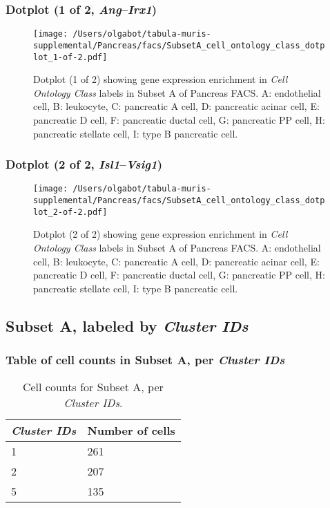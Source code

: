 \clearpage

\subsubsection{Dotplot (1 of 2, \emph{Ang}--\emph{Irx1})}
\begin{figure}[h]
\centering
\texttt{[image: /Users/olgabot/tabula-muris-supplemental/Pancreas/facs/SubsetA\_cell\_ontology\_class\_dotplot\_1-of-2.pdf]}

\caption{ Dotplot (1 of 2)  showing gene expression enrichment in \emph{Cell Ontology Class} labels in Subset A of Pancreas FACS. A: endothelial cell, B: leukocyte, C: pancreatic A cell, D: pancreatic acinar cell, E: pancreatic D cell, F: pancreatic ductal cell, G: pancreatic PP cell, H: pancreatic stellate cell, I: type B pancreatic cell.}
\end{figure}


\clearpage

\subsubsection{Dotplot (2 of 2, \emph{Isl1}--\emph{Vsig1})}
\begin{figure}[h]
\centering
\texttt{[image: /Users/olgabot/tabula-muris-supplemental/Pancreas/facs/SubsetA\_cell\_ontology\_class\_dotplot\_2-of-2.pdf]}

\caption{ Dotplot (2 of 2)  showing gene expression enrichment in \emph{Cell Ontology Class} labels in Subset A of Pancreas FACS. A: endothelial cell, B: leukocyte, C: pancreatic A cell, D: pancreatic acinar cell, E: pancreatic D cell, F: pancreatic ductal cell, G: pancreatic PP cell, H: pancreatic stellate cell, I: type B pancreatic cell.}
\end{figure}


\clearpage

\subsection{Subset A, labeled by \emph{Cluster IDs}}
\subsubsection{Table of cell counts in Subset A, per \emph{Cluster IDs}}\begin{table}[h]
\centering
\label{my-label}
\begin{tabular}{@{}ll@{}}
\toprule

\emph{Cluster IDs}& Number of cells \\ \midrule
1 & 261 \\

2 & 207 \\

5 & 135 \\
\bottomrule
\end{tabular}
\caption{Cell counts for Subset A, per \emph{Cluster IDs}.}
\end{table}

